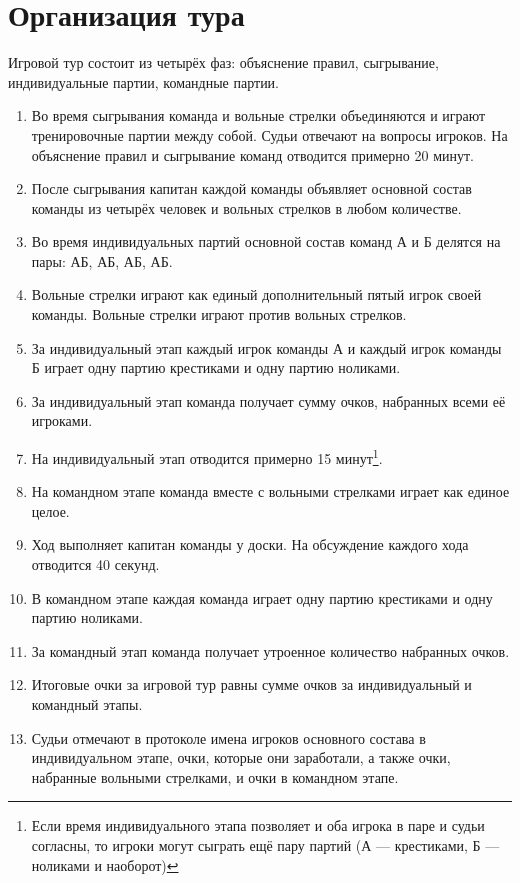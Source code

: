 \documentclass[11pt]{article} %
\begin{document}
\newpage
\section*{Организация тура}

Игровой тур состоит из четырёх фаз: объяснение правил, сыгрывание, индивидуальные партии, командные партии.

\begin{enumerate}
    \item Во время сыгрывания команда и вольные стрелки объединяются и играют тренировочные партии между собой. 
    Судьи отвечают на вопросы игроков. На объяснение правил и сыгрывание команд отводится примерно 20 минут. 
    \item После сыгрывания капитан каждой команды объявляет основной состав команды из четырёх человек и вольных стрелков в любом количестве.
    \item Во время индивидуальных партий основной состав команд А и Б делятся на пары: АБ, АБ, АБ, АБ. 
    \item Вольные стрелки играют как единый дополнительный пятый игрок своей команды. 
    Вольные стрелки играют против вольных стрелков. 
    \item За индивидуальный этап каждый игрок команды А и каждый игрок команды Б играет одну партию крестиками и одну партию ноликами. 
    \item За индивидуальный этап команда получает сумму очков, набранных всеми её игроками. 
    \item На индивидуальный этап отводится примерно 15 минут\footnote{Если время индивидуального этапа позволяет и оба игрока в паре и судьи согласны, то игроки могут сыграть ещё пару партий (А — крестиками, Б — ноликами и наоборот)}.
    \item На командном этапе команда вместе с вольными стрелками играет как единое целое. 
    \item Ход выполняет капитан команды у доски. На обсуждение каждого хода отводится 40 секунд. 
    \item В командном этапе каждая команда играет одну партию крестиками и одну партию ноликами.
    \item За командный этап команда получает утроенное количество набранных очков. 
    \item Итоговые очки за игровой тур равны сумме очков за индивидуальный и командный этапы.
    \item Судьи отмечают в протоколе имена игроков основного состава в индивидуальном этапе, очки, которые они заработали, 
    а также очки, набранные вольными стрелками, и очки в командном этапе. 
\end{enumerate}
\end{document}
